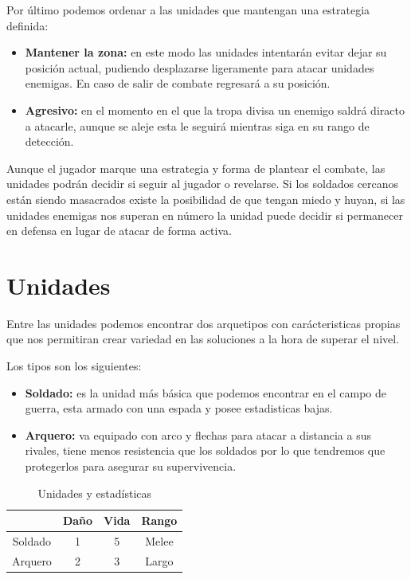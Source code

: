 \newpage
Por último podemos ordenar a las unidades que mantengan una estrategia definida:

\begin{itemize}
\item \textbf{Mantener la zona:} en este modo las unidades intentarán evitar dejar su posición
actual, pudiendo desplazarse ligeramente para atacar unidades enemigas. En caso de salir de combate
regresará a su posición.

\item \textbf{Agresivo:} en el momento en el que la tropa divisa un enemigo saldrá diracto a atacarle,
aunque se aleje esta le seguirá mientras siga en su rango de detección.
\end{itemize} 

Aunque el jugador marque una estrategia y forma de plantear el combate, las unidades podrán
decidir si seguir al jugador o revelarse. Si los soldados cercanos están siendo masacrados
existe la posibilidad de que tengan miedo y huyan, si las unidades enemigas nos superan en número
la unidad puede decidir si permanecer en defensa en lugar de atacar de forma activa.

\section{Unidades}
Entre las unidades podemos encontrar dos arquetipos con carácteristicas propias
que nos permitiran crear variedad en las soluciones a la hora de superar el
nivel.

Los tipos son los siguientes:
\begin{itemize}
	\item \textbf{Soldado:} es la unidad más básica que podemos encontrar en el campo de
							guerra, esta armado con una espada y posee estadisticas
							bajas.
	\item \textbf{Arquero:} va equipado con arco y flechas para atacar a distancia a
							sus rivales, tiene menos resistencia que los soldados por
							lo que tendremos que protegerlos para asegurar su
							supervivencia.
\end{itemize}

\begin{table}[ht]
\begin{center}
\begin{tabular}{|c|c|c|c|}
\hline
        & Daño & Vida & Rango \\ 
\hline
\hline
Soldado & 1    & 5    & Melee \\ 
\hline
Arquero & 2    & 3    & Largo \\ 
\hline
\end{tabular}\\
\caption{Unidades y estadísticas}
\end{center}
\end{table}


